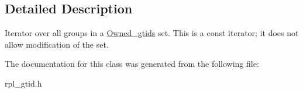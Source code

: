 \subsection{Detailed Description}
Iterator over all groups in a \mbox{\hyperlink{classOwned__gtids}{Owned\+\_\+gtids}} set. This is a const iterator; it does not allow modification of the set. 

The documentation for this class was generated from the following file\+:\begin{DoxyCompactItemize}
\item 
rpl\+\_\+gtid.\+h\end{DoxyCompactItemize}
